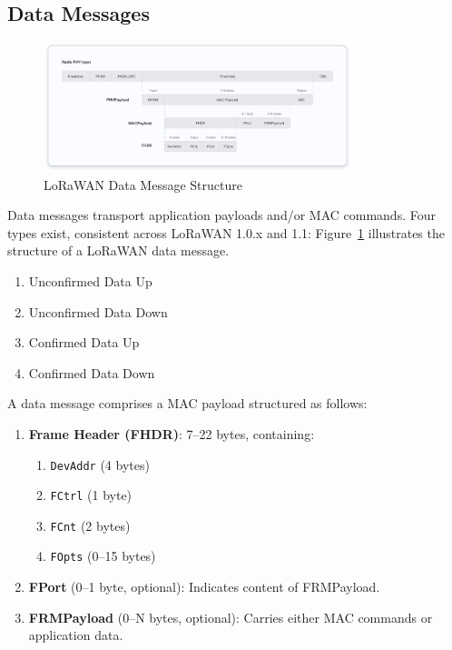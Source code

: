 \subsection{Data Messages}
\begin{figure}
    \centering
    \includegraphics[width=0.8\textwidth]{figures/payload.png}
    \caption{LoRaWAN Data Message Structure}
    \label{fig:lora_data_message}
\end{figure}

Data messages transport application payloads and/or MAC commands. Four types exist, consistent across LoRaWAN 1.0.x and 1.1:
Figure~\ref{fig:lora_data_message} illustrates the structure of a LoRaWAN data message.
\begin{enumerate}
    \item Unconfirmed Data Up
    \item Unconfirmed Data Down
    \item Confirmed Data Up
    \item Confirmed Data Down
\end{enumerate}

A data message comprises a MAC payload structured as follows:

\begin{enumerate}
    \item \textbf{Frame Header (FHDR)}: 7–22 bytes, containing:
          \begin{enumerate}
              \item \texttt{DevAddr} (4 bytes)
              \item \texttt{FCtrl} (1 byte)
              \item \texttt{FCnt} (2 bytes)
              \item \texttt{FOpts} (0–15 bytes)
          \end{enumerate}
    \item \textbf{FPort} (0–1 byte, optional): Indicates content of FRMPayload.
    \item \textbf{FRMPayload} (0–N bytes, optional): Carries either MAC commands or application data.
\end{enumerate}


